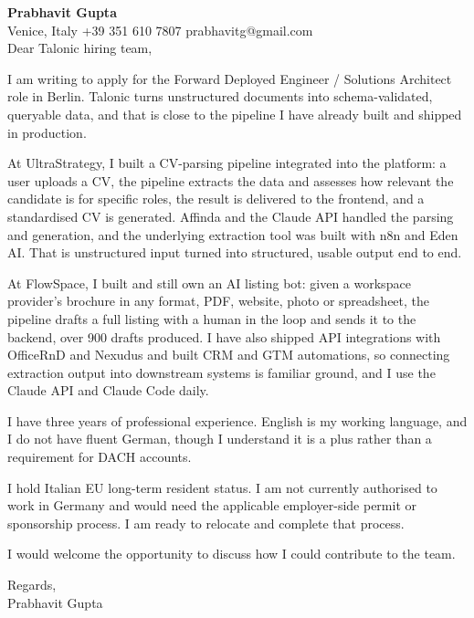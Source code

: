 \documentclass[a4paper,10.5pt]{article}
\begin{document}
\textbf{Prabhavit Gupta}\\
Venice, Italy \textbar{} +39 351 610 7807 \textbar{} prabhavitg@gmail.com\\[10pt]
Dear Talonic hiring team,

I am writing to apply for the Forward Deployed Engineer / Solutions Architect role in Berlin. Talonic turns unstructured documents into schema-validated, queryable data, and that is close to the pipeline I have already built and shipped in production.

At UltraStrategy, I built a CV-parsing pipeline integrated into the platform: a user uploads a CV, the pipeline extracts the data and assesses how relevant the candidate is for specific roles, the result is delivered to the frontend, and a standardised CV is generated. Affinda and the Claude API handled the parsing and generation, and the underlying extraction tool was built with n8n and Eden AI. That is unstructured input turned into structured, usable output end to end.

At FlowSpace, I built and still own an AI listing bot: given a workspace provider's brochure in any format, PDF, website, photo or spreadsheet, the pipeline drafts a full listing with a human in the loop and sends it to the backend, over 900 drafts produced. I have also shipped API integrations with OfficeRnD and Nexudus and built CRM and GTM automations, so connecting extraction output into downstream systems is familiar ground, and I use the Claude API and Claude Code daily.

I have three years of professional experience. English is my working language, and I do not have fluent German, though I understand it is a plus rather than a requirement for DACH accounts.

I hold Italian EU long-term resident status. I am not currently authorised to work in Germany and would need the applicable employer-side permit or sponsorship process. I am ready to relocate and complete that process.

I would welcome the opportunity to discuss how I could contribute to the team.

Regards,\\
Prabhavit Gupta
\end{document}
